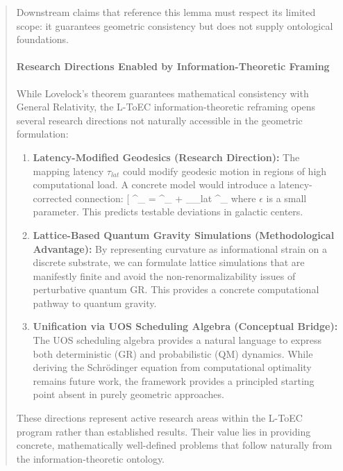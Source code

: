 \documentclass[11pt,titlepage]{article}
\begin{document}
\begin{abstract}
Downstream claims that reference this lemma must respect its limited scope: it guarantees geometric consistency but does not supply ontological foundations.


\paragraph{Research Directions Enabled by Information-Theoretic Framing}
While Lovelock's theorem guarantees mathematical consistency with General Relativity, the L-ToEC information-theoretic reframing opens several research directions not naturally accessible in the geometric formulation:

\begin{enumerate}
    \item \textbf{Latency-Modified Geodesics (Research Direction):} The mapping latency $\tau_{lat}$ could modify geodesic motion in regions of high computational load. A concrete model would introduce a latency-corrected connection:
    [
    \tilde{\Gamma}^\alpha_{\beta\gamma} = \Gamma^\alpha_{\beta\gamma} + \epsilon \nabla_\beta \tau_{lat} \delta^\alpha_\gamma
    \]
    where $\epsilon$ is a small parameter. This predicts testable deviations in galactic centers.
    
    \item \textbf{Lattice-Based Quantum Gravity Simulations (Methodological Advantage):} By representing curvature as informational strain on a discrete substrate, we can formulate lattice simulations that are manifestly finite and avoid the non-renormalizability issues of perturbative quantum GR. This provides a concrete computational pathway to quantum gravity.
    
    \item \textbf{Unification via UOS Scheduling Algebra (Conceptual Bridge):} The UOS scheduling algebra provides a natural language to express both deterministic (GR) and probabilistic (QM) dynamics. While deriving the Schr\"odinger equation from computational optimality remains future work, the framework provides a principled starting point absent in purely geometric approaches.
\end{enumerate}

These directions represent active research areas within the L-ToEC program rather than established results. Their value lies in providing concrete, mathematically well-defined problems that follow naturally from the information-theoretic ontology.

\end{abstract}
\end{document}
